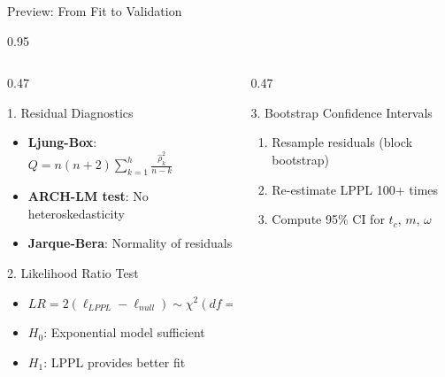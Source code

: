 \documentclass[9pt, aspectratio=169, t]{beamer}
\begin{document}
\begin{frame}{Preview: From Fit to Validation}
    \begin{cminipage}{0.95\textwidth}
    {\scriptsize
    \begin{columns}[T]
        \begin{column}{0.47\textwidth}
            \begin{block}{1. Residual Diagnostics}
                \begin{itemize}\setlength{\itemsep}{0pt}
                    \item \textbf{Ljung-Box}: $Q = n(n+2)\sum_{k=1}^{h}\frac{\hat{\rho}_k^2}{n-k}$
                    \item \textbf{ARCH-LM test}: No heteroskedasticity
                    \item \textbf{Jarque-Bera}: Normality of residuals
                \end{itemize}
            \end{block}

            \begin{alertblock}{2. Likelihood Ratio Test}
                \begin{itemize}\setlength{\itemsep}{0pt}
                    \item $LR = 2(\ell_{LPPL} - \ell_{null}) \sim \chi^2(df = 4)$
                    \item $H_0$: Exponential model sufficient
                    \item $H_1$: LPPL provides better fit
                \end{itemize}
            \end{alertblock}
        \end{column}
        \begin{column}{0.47\textwidth}
            \begin{exampleblock}{3. Bootstrap Confidence Intervals}
                \begin{enumerate}\setlength{\itemsep}{0pt}
                    \item Resample residuals (block bootstrap)
                    \item Re-estimate LPPL 100+ times
                    \item Compute 95\% CI for $t_c$, $m$, $\omega$
                \end{enumerate}
            \end{exampleblock}


\end{column}
\end{columns}}
\end{cminipage}
\end{frame}
\end{document}
